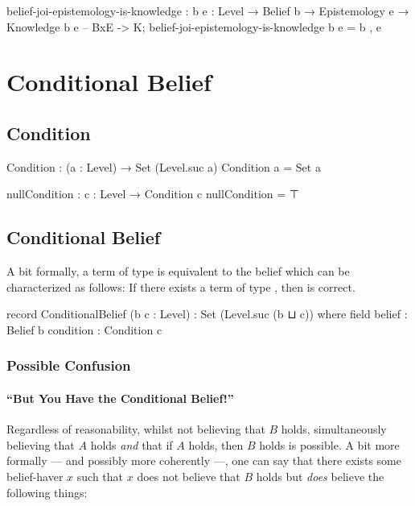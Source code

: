 \documentclass{article}
\begin{document}
\begin{code}
belief-joi-epistemology-is-knowledge :
  {b e : Level} → Belief b → Epistemology e → Knowledge b e -- BxE -> K;
belief-joi-epistemology-is-knowledge b e = b , e
\end{code}

\section{Conditional Belief}

\subsection{Condition}

\begin{code}
Condition : (a : Level) → Set (Level.suc a)
Condition a = Set a

nullCondition : {c : Level} → Condition c
nullCondition = ⊤
\end{code}

\subsection{Conditional Belief}
A bit formally, a term  of type  is equivalent to the belief which can be characterized as follows: If there exists a term of type  , then   is correct.

\begin{code}
record ConditionalBelief (b c : Level) : Set (Level.suc (b ⊔ c)) where
  field
    belief : Belief b
    condition : Condition c
\end{code}

\subsubsection{Possible Confusion}
\paragraph{``But You Have the Conditional Belief!''}
Regardless of reasonability, whilst not believing that \(B\) holds, simultaneously believing that \(A\) holds \emph{and} that if \(A\) holds, then \(B\) holds is possible.  A bit more formally --- and possibly more coherently ---, one can say that there exists some belief-haver \(x\) such that \(x\) does not believe that \(B\) holds but \emph{does} believe the following things:
\end{document}
